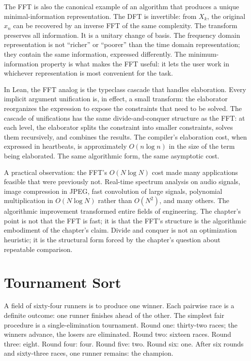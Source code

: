 The FFT is also the canonical example of an algorithm that produces a
unique minimal-information representation. The DFT is invertible: from
$X_k$, the original $x_n$ can be recovered by an inverse FFT of the
same complexity. The transform preserves all information. It is a
unitary change of basis. The frequency domain representation is not
``richer'' or ``poorer'' than the time domain representation; they
contain the same information, expressed differently. The minimum-
information property is what makes the FFT useful: it lets the user
work in whichever representation is most convenient for the task.

In Lean, the FFT analog is the typeclass cascade that handles
elaboration. Every implicit argument unification is, in effect, a small
transform: the elaborator reorganizes the expression to expose the
constraints that need to be solved. The cascade of unifications has the
same divide-and-conquer structure as the FFT: at each level, the
elaborator splits the constraint into smaller constraints, solves them
recursively, and combines the results. The compiler's elaboration cost,
when expressed in heartbeats, is approximately $O(n \log n)$ in the size
of the term being elaborated. The same algorithmic form, the same
asymptotic cost.

A practical observation: the FFT's $O(N \log N)$ cost made many
applications feasible that were previously not. Real-time spectrum
analysis on audio signals, image compression in JPEG, fast convolution
of large signals, polynomial multiplication in $O(N \log N)$ rather than
$O(N^2)$, and many others. The algorithmic improvement transformed entire
fields of engineering. The chapter's point is not that the FFT is fast;
it is that the FFT's structure is the algorithmic embodiment of the
chapter's claim. Divide and conquer is not an optimization heuristic; it
is the structural form forced by the chapter's question about repeatable
comparison.

\section{Tournament Sort}
\label{se:tournament-sort}

A field of sixty-four runners is to produce one winner. Each pairwise race is
a definite outcome: one runner finishes ahead of the other. The simplest
fair procedure is a single-elimination tournament. Round one: thirty-two
races; the winners advance, the losers are eliminated. Round two: sixteen
races. Round three: eight. Round four: four. Round five: two. Round six:
one. After six rounds and sixty-three races, one runner remains: the
champion.

